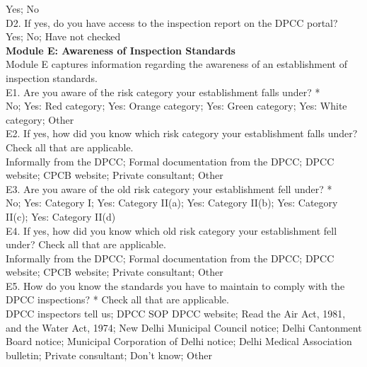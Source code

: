 \documentclass[a4paper, 12pt, twoside]{article}
\begin{document}
\begin{mdframed}[backgroundcolor=gray!20]
		Yes; No \\
		
		D2. If yes, do you have access to the inspection report on the DPCC portal? \\
		
		Yes; No; Have not checked \\
		
		    		\textbf{Module E: Awareness of Inspection Standards} \\
		
		Module E captures information regarding the awareness of an establishment of inspection standards. \\
		
		E1. Are you aware of the risk category your establishment falls under? * \\
		
		No; Yes: Red category; Yes: Orange category; Yes: Green category; Yes: White category; Other \\
		
		E2. If yes, how did you know which risk category your establishment falls under? Check all that are applicable. \\
		
		Informally from the DPCC; Formal documentation from the DPCC; DPCC website; CPCB website; Private consultant; Other \\
		
		E3. Are you aware of the old risk category your establishment fell under? *  \\
		
		No; Yes: Category I; Yes: Category II(a); Yes: Category II(b); Yes: Category II(c); Yes: Category II(d) \\
		
		E4. If yes, how did you know which old risk category your establishment fell under? Check all that are applicable. \\
		
		Informally from the DPCC; Formal documentation from the DPCC; DPCC website; CPCB website; Private consultant; Other \\		
		
		E5. How do you know the standards you have to maintain to comply with the DPCC inspections? * Check all that are applicable. \\
		
		DPCC inspectors tell us; DPCC SOP DPCC website; Read the Air Act, 1981, and the Water Act, 1974; New Delhi Municipal Council notice; Delhi Cantonment Board notice; Municipal Corporation of Delhi notice; Delhi Medical Association bulletin; Private consultant; Don't know; Other \\
		

\end{mdframed}
\end{document}
